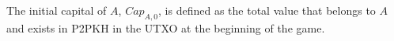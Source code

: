 \begin{definition}[Capital]
   The initial capital of $A$, $Cap_{A, 0}$, is defined as the total value that belongs to $A$ and exists in P2PKH in
   the UTXO at the beginning of the game.
\end{definition}
